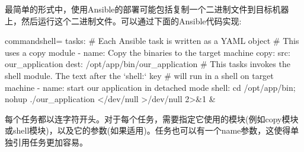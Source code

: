 

最简单的形式中，使用Ansible的部署可能包括复制一个二进制文件到目标机器上，然后运行这个二进制文件。可以通过下面的Ansible代码实现:

\begin{tcblisting}{commandshell={}}
tasks:
  # Each Ansible task is written as a YAML object
  # This uses a copy module
  - name: Copy the binaries to the target machine
    copy:
      src: our_application
      dest: /opt/app/bin/our_application
  # This tasks invokes the shell module. The text after the `shell:` key
  # will run in a shell on target machine
  - name: start our application in detached mode
    shell: cd /opt/app/bin; nohup ./our_application </dev/null >/dev/null
2>&1 &
\end{tcblisting}

每个任务都以连字符开头。对于每个任务，需要指定它使用的模块(例如copy模块或shell模块)，以及它的参数(如果适用)。任务也可以有一个name参数，这使得单独引用任务更加容易。


